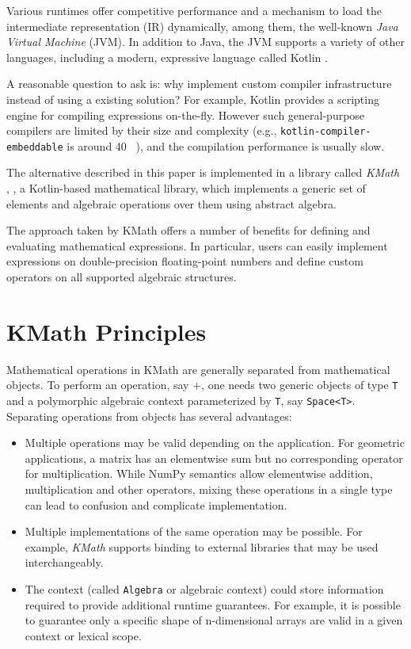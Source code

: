 \documentclass[conference]{IEEEtran}
\begin{document}
Various runtimes offer competitive performance and a mechanism to load the intermediate representation (IR) dynamically, among them, the well-known \textit{Java Virtual Machine} (JVM). In addition to Java, the JVM supports a variety of other languages, including a modern, expressive language called Kotlin \cite{Kotlin}.

A reasonable question to ask is: why implement custom compiler infrastructure instead of using a existing solution? For example, Kotlin provides a scripting engine for compiling expressions on-the-fly. However such general-purpose compilers are limited by their size and complexity (e.g., \texttt{kotlin-compiler-embeddable} is around 40 \si{\mebi\byte}), and the compilation performance is usually slow.

The alternative described in this paper is implemented in a library called \textit{KMath} \cite{doi:10.1063/1.5130103}, \cite{alexander_nozik_2021_4452686}, a Kotlin-based mathematical library, which implements a generic set of elements and algebraic operations over them using abstract algebra.

The approach taken by KMath offers a number of benefits for defining and evaluating mathematical expressions. In particular, users can easily implement expressions on double-precision floating-point numbers and define custom operators on all supported algebraic structures.

\section{KMath Principles}

Mathematical operations in KMath are generally separated from mathematical objects. To perform an operation, say $+$, one needs two generic objects of type \texttt{T} and a polymorphic algebraic context parameterized by \texttt{T}, say \texttt{Space<T>}. Separating operations from objects has several advantages:

\begin{itemize}
    \item Multiple operations may be valid depending on the application. For geometric applications, a matrix has an elementwise sum but no corresponding operator for multiplication. While NumPy semantics allow elementwise addition, multiplication and other operators, mixing these operations in a single type can lead to confusion and complicate implementation.
    \item Multiple implementations of the same operation may be possible. For example, \textit{KMath} supports binding to external libraries that may be used interchangeably.
    \item The context (called \texttt{Algebra} or algebraic context) could store information required to provide additional runtime guarantees. For example, it is possible to guarantee only a specific shape of n-dimensional arrays are valid in a given context or lexical scope.~\cite{Considine2019KotlinAS}
\end{itemize}
\end{document}
